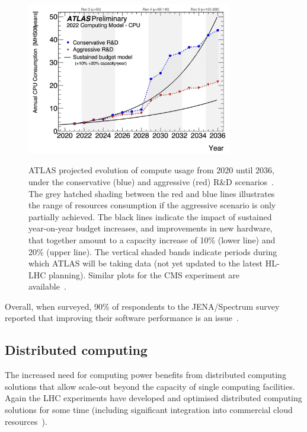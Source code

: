 \begin{figure}[htbp]
\begin{center}
\includegraphics[width=0.8\textwidth]{figures/Figure4} \\ 
\caption{ATLAS projected evolution of compute usage from 2020 until 2036, under the conservative (blue) and aggressive (red) R\&D scenarios~\cite{CERN-LHCC-2022-005}. The grey hatched shading between the red and blue lines illustrates the range of resources consumption if the aggressive scenario is only partially achieved. The black lines indicate the impact of sustained year-on-year budget increases, and improvements in new hardware, that together amount to a capacity increase of 10\% (lower line) and 20\% (upper line). The vertical shaded bands indicate periods during which ATLAS will be taking data  (not yet updated to the latest HL-LHC planning). Similar plots for the CMS experiment are available~\cite{Software:2815292}. }
\label{figures:Fig4}
\end{center}
\end{figure}


Overall, when surveyed, 90\% of respondents to the JENA/Spectrum survey reported that improving their software performance is an issue~\cite{JENA-Spectrum-Survey-Report}.



\subsection{Distributed computing}


The increased need for computing power benefits from distributed computing solutions that allow scale-out beyond the capacity of single computing facilities. Again the LHC experiments have developed and optimised distributed computing solutions for some time (including significant integration into commercial cloud resources~\cite{Megino_2024}).

